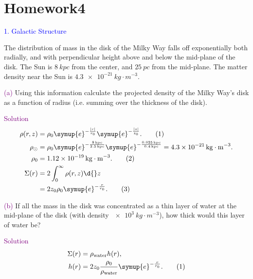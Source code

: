 \documentclass[UTF8, 12pt, a4paper, oneside, twocolumn, fontset=none]{ctexart}
\begin{document}
\section*{Homework4}

\hspace*{\fill}

\noindent\textcolor{blue}{1. Galactic Structure}

\noindent The distribution of mass in the disk of the Milky Way falls off exponentially both radially, and with perpendicular height above and below the mid-plane of the disk. The Sun is $\qty{8}{kpc}$ from the center, and $\qty{25}{pc}$ from the mid-plane. The matter density near the Sun is $\qty{4.3e-21}{kg\cdot{}m^{-3}}$.

\hspace*{\fill}

\noindent\textcolor{purple}{(a)} Using this information calculate the projected density of the Milky Way's disk as a function of radius (i.e. summing over the thickness of the disk).

\hspace*{\fill}

\noindent\textcolor{purple}{Solution}
\begin{align}
\rho\mleft(r, z\mright)&=\rho_{0}\symup{e}^{-\frac{\mleft\vert{}r\mright\vert}{r_{0}}}\symup{e}^{-\frac{\mleft\vert{}z\mright\vert}{z_{0}}}.\tag{1}\\
\rho_{\odot}&=\rho_{0}\symup{e}^{-\frac{\qty{8}{kpc}}{\qty{2.5}{kpc}}}\symup{e}^{-\frac{\qty{0.025}{kpc}}{\qty{0.4}{kpc}}}=\qty{4.3e-21}{kg\cdot{}m^{-3}}.\notag\\
\rho_{0}&=\qty{1.12e-19}{kg\cdot{}m^{-3}}.\tag{2}\\
\Sigma\mleft(r\mright)&=2\int_{0}^{\infty}\rho\mleft(r, z\mright)\d{}z\notag\\
&=2z_{0}\rho_{0}\symup{e}^{-\frac{r}{r_{0}}}.\tag{3}
\end{align}

\hspace*{\fill}

\noindent\textcolor{purple}{(b)} If all the mass in the disk was concentrated as a thin layer of water at the mid-plane of the disk (with density $\qty{e3}{kg\cdot{}m^{-3}}$), how thick would this layer of water be?

\hspace*{\fill}

\noindent\textcolor{purple}{Solution}
\begin{align}
\Sigma\mleft(r\mright)&=\rho_{\text{water}}h\mleft(r\mright),\notag\\
h\mleft(r\mright)&=2z_{0}\frac{\rho_{0}}{\rho_{\text{water}}}\symup{e}^{-\frac{r}{r_{0}}}.\tag{1}
\end{align}
\end{document}
